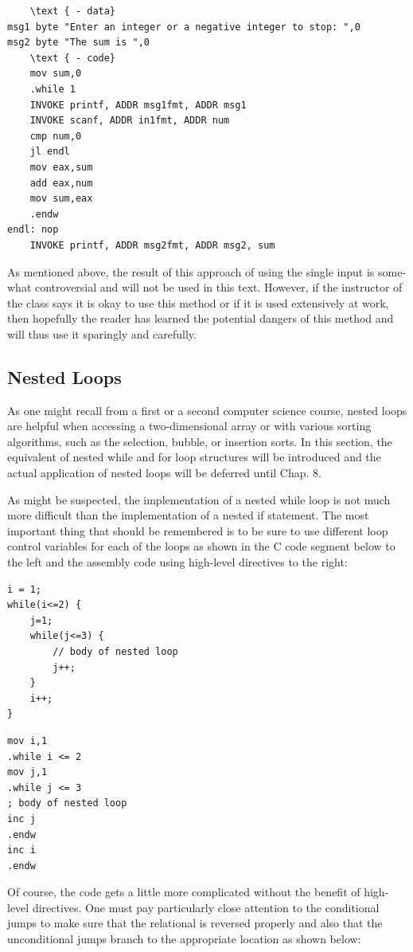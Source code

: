 \documentclass[10pt]{article}
\begin{document}
\begin{verbatim}
    \text { - data}
msg1 byte "Enter an integer or a negative integer to stop: ",0
msg2 byte "The sum is ",0
    \text { - code}
    mov sum,0
    .while 1
    INVOKE printf, ADDR msg1fmt, ADDR msg1
    INVOKE scanf, ADDR in1fmt, ADDR num
    cmp num,0
    jl endl
    mov eax,sum
    add eax,num
    mov sum,eax
    .endw
endl: nop
    INVOKE printf, ADDR msg2fmt, ADDR msg2, sum
\end{verbatim}

As mentioned above, the result of this approach of using the single input is some-what controversial and will not be used in this text. However, if the instructor of the class says it is okay to use this method or if it is used extensively at work, then hopefully the reader has learned the potential dangers of this method and will thus use it sparingly and carefully.

\subsection*{Nested Loops}
As one might recall from a first or a second computer science course, nested loops are helpful when accessing a two-dimensional array or with various sorting algorithms, such as the selection, bubble, or insertion sorts. In this section, the equivalent of nested while and for loop structures will be introduced and the actual application of nested loops will be deferred until Chap. 8.

As might be suspected, the implementation of a nested while loop is not much more difficult than the implementation of a nested if statement. The most important thing that should be remembered is to be sure to use different loop control variables for each of the loops as shown in the C code segment below to the left and the assembly code using high-level directives to the right:

\begin{verbatim}
i = 1;
while(i<=2) {
    j=1;
    while(j<=3) {
        // body of nested loop
        j++;
    }
    i++;
}
\end{verbatim}

\begin{verbatim}
mov i,1
.while i <= 2
mov j,1
.while j <= 3
; body of nested loop
inc j
.endw
inc i
.endw
\end{verbatim}

Of course, the code gets a little more complicated without the benefit of high-level directives. One must pay particularly close attention to the conditional jumps to make sure that the relational is reversed properly and also that the unconditional jumps branch to the appropriate location as shown below:
\end{document}
